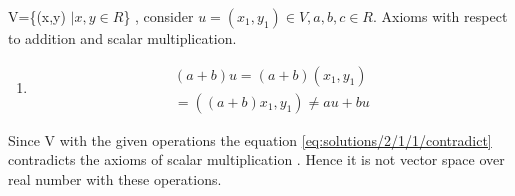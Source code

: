 V=\{(x,y) $\vert x,y \in R$\} , consider $u = (x_1,y_1) \in V , a,b,c \in R$. Axioms with respect to addition and scalar multiplication.
\begin{enumerate}
 \item
 \begin{align}
 (a+b)u=(a+b)(x_1,y_1)\\
 =((a+b)x_1,y_1)\neq au+bu\label{eq:solutions/2/1/1/contradict}
 \end{align}
\end{enumerate}
Since V with the given operations the equation \eqref{eq:solutions/2/1/1/contradict}  contradicts the axioms of scalar multiplication . Hence it is not vector space over real number with these operations.

